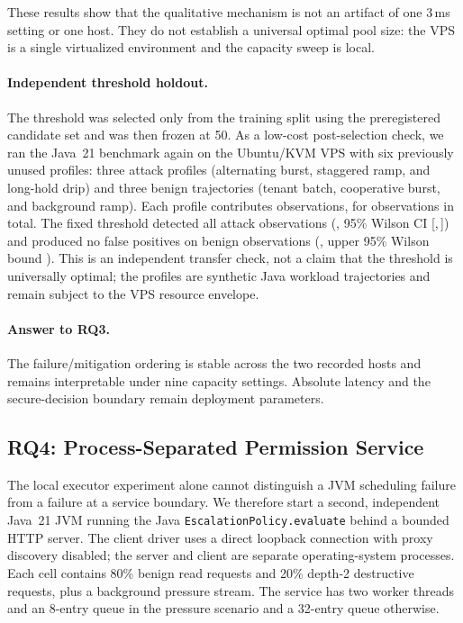 These results show that the qualitative mechanism is not an artifact of one
3\,ms setting or one host. They do not establish a universal optimal pool
size: the VPS is a single virtualized environment and the capacity sweep is
local.

\paragraph{Independent threshold holdout.}
The threshold was selected only from the training split using the preregistered
candidate set and was then frozen at 50. As a low-cost post-selection check, we
ran the Java~21 benchmark again on the Ubuntu/KVM VPS with six
previously unused profiles: three attack profiles (alternating burst,
staggered ramp, and long-hold drip) and three benign trajectories (tenant
batch, cooperative burst, and background ramp). Each profile contributes
\ThresholdHoldoutPerProfileCount{} observations, for
\ThresholdHoldoutObservationCount{} observations in total. The fixed threshold
detected all \ThresholdHoldoutAttackCount{} attack observations
(\ThresholdHoldoutAttackDetection{}, 95\% Wilson CI
[\ThresholdHoldoutAttackCILow{},\,\ThresholdHoldoutAttackCIHigh{}]) and produced
no false positives on \ThresholdHoldoutBenignCount{} benign observations
(\ThresholdHoldoutBenignFP{}, upper 95\% Wilson bound
\ThresholdHoldoutBenignFPCIHigh{}). This is an independent transfer check, not
a claim that the threshold is universally optimal; the profiles are synthetic
Java workload trajectories and remain subject to the VPS resource envelope.

\paragraph{Answer to RQ3.}
The failure/mitigation ordering is stable across the two recorded hosts and
remains interpretable under nine capacity settings. Absolute latency and the
secure-decision boundary remain deployment parameters.

\subsection{RQ4: Process-Separated Permission Service}
\label{sec:eval-remote-permission}

The local executor experiment alone cannot distinguish a JVM scheduling
failure from a failure at a service boundary. We therefore start a second,
independent Java~21 JVM running the Java
\texttt{EscalationPolicy.evaluate} behind a bounded HTTP server. The client
driver uses a direct loopback connection with proxy discovery disabled; the
server and client are separate operating-system processes. Each cell contains
80\% benign read requests and 20\% depth-2 destructive requests, plus a
background pressure stream. The service has two worker threads and an
8-entry queue in the pressure scenario and a 32-entry queue otherwise.

